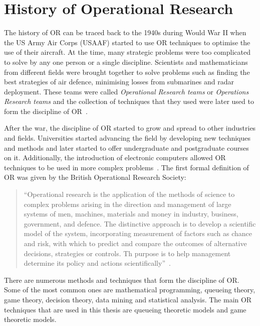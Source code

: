 \section{History of Operational Research}\label{sec:intro_or_history}

The history of OR can be traced back to the 1940s during Would War II when the
US Army Air Corps (USAAF) started to use OR techniques to optimise the use of
their aircraft.
At the time, many strategic problems were too complicated to solve by any one
person or a single discipline.
Scientists and mathematicians from different fields were brought together to
solve problems such as finding the best strategies of air defence, minimising
losses from submarines and radar deployment.
These teams were called \textit{Operational Research teams} or
\textit{Operations Research teams} and the collection of techniques that they
used were later used to form the discipline of
OR~\cite{ravindran2008operations}.

After the war, the discipline of OR started to grow and spread to other
industries and fields.
Universities started advancing the field by developing new techniques and
methods and later started to offer undergraduate and postgraduate courses on it.
Additionally, the introduction of electronic computers allowed OR techniques to
be used in more complex problems~\cite{ravindran2008operations}.
The first formal definition of OR was given by the British Operational
Research Society:

\begin{quotation}
    ``Operational research is the application of the methods of science to
    complex problems arising in the direction and management of large systems of
    men, machines, materials and money in industry, business, government, and
    defence.
    The distinctive approach is to develop a scientific model of the system,
    incorporating measurement of factors such as chance and risk, with which to
    predict and compare the outcomes of alternative decisions, strategies or
    controls.
    Th purpose is to help management determine its policy and actions
    scientifically''~\cite{or_for_multi_organizations}.
\end{quotation}

There are numerous methods and techniques that form the discipline of OR.
Some of the most common ones are mathematical programming, queueing theory,
game theory, decision theory, data mining and statistical analysis.
The main OR techniques that are used in this thesis are queueing theoretic
models and game theoretic models.

